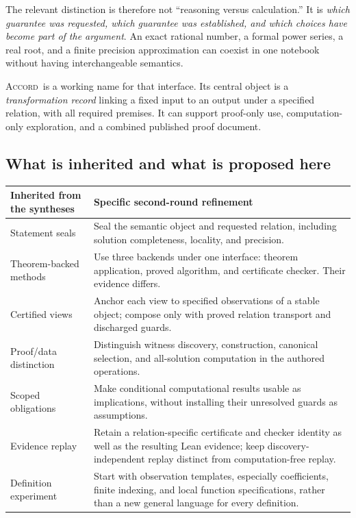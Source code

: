 \documentclass[11pt,letterpaper]{article}
\newcommand{\Accord}{\textsc{Accord}}
\theoremstyle{definition}
\begin{document}
The relevant distinction is therefore not ``reasoning versus calculation.'' It is
\emph{which guarantee was requested, which guarantee was established, and which
choices have become part of the argument}. An exact rational number, a formal
power series, a real root, and a finite precision approximation can coexist in one
notebook without having interchangeable semantics.

\Accord\ is a working name for that interface. Its central object is a
\emph{transformation record} linking a fixed input to an output under a specified
relation, with all required premises. It can support proof-only use, computation-only
exploration, and a combined published proof document.

\subsection{What is inherited and what is proposed here}
\begin{tabularx}{\textwidth}{@{}P{.28\textwidth}Y@{}}
\toprule
Inherited from the syntheses & Specific second-round refinement \\
\midrule
Statement seals & Seal the semantic object and requested relation, including
solution completeness, locality, and precision.\\
Theorem-backed methods & Use three backends under one interface: theorem
application, proved algorithm, and certificate checker. Their evidence differs.\\
Certified views & Anchor each view to specified observations of a stable object;
compose only with proved relation transport and discharged guards.\\
Proof/data distinction & Distinguish witness discovery, construction, canonical
selection, and all-solution computation in the authored operations.\\
Scoped obligations & Make conditional computational results usable as implications,
without installing their unresolved guards as assumptions.\\
Evidence replay & Retain a relation-specific certificate and checker identity as
well as the resulting Lean evidence; keep discovery-independent replay distinct
from computation-free replay.\\
Definition experiment & Start with observation templates, especially coefficients,
finite indexing, and local function specifications, rather than a new general
language for every definition.\\
\bottomrule
\end{tabularx}
\end{document}
